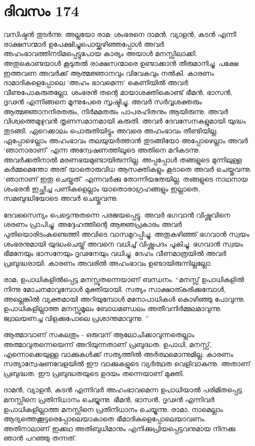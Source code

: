 \section{ദിവസം 174}


വസിഷ്ഠൻ തുടർന്നു: അല്ലയോ രാമ: ശംഭരനെ ദാമൻ, വ്യാളൻ, കടൻ എന്നീ രാക്ഷസന്മാർ ഉപേക്ഷിച്ചുപൊയ്ക്കഴിഞ്ഞപ്പോൾ അവർ അഹംഭാവത്തിനടിമപ്പെട്ടുപോയ കാര്യം അയാൾ മനസ്സിലാക്കി. അതുകൊണ്ടയാൾ കൂടുതൽ രാക്ഷസന്മാരെ ഉണ്ടാക്കാൻ തീരുമാനിച്ചു. പക്ഷേ ഇത്തവണ അവർക്ക് ആത്മജ്ഞാനവും വിവേകവും നൽകി. കാരണം ദാമാദികളെപ്പോലെ ‘അഹം ഭാവമെന്ന’ കെണിയിൽ അവർ വീണുപോകരുതല്ലോ. ശംഭരൻ തന്റെ മായാശക്തികൊണ്ട് ഭീമൻ, ഭാസൻ, ദൃഢൻ എന്നിങ്ങനെ മൂന്നുപേരെ സൃഷ്ടിച്ചു. അവർ സർവ്വശക്തരും ആത്മജ്ഞാനനിരതരും, നിർമമതരും പാപരഹിതനും ആയിരുന്നു. അവർ വിശ്വത്തെമുഴുവൻ തൃണസമാനമായി കരുതി. അവർ ദേവസേനകളുമായി യുദ്ധം തുടങ്ങി. ഏറെക്കാലം പൊരുതിയിട്ടും അവരെ അഹംഭാവം തീണ്ടിയില്ല. ഏപ്പോഴെല്ലാം അഹംഭാവം തലയുയർത്താൻ തുടങ്ങിയോ അപ്പോഴെല്ലാം അവർ ‘ഞാനാരാണ്‌’ എന്ന അന്വേഷണത്തിലൂടെ അതിനെ മറികടന്നു. അവർക്കതിനാൽ മരണഭയമുണ്ടായിരുന്നില്ല. അപ്പപ്പോള്‍ തങ്ങളുടെ മുന്നിലുള്ള കർമ്മമെന്തോ അത് യാതൊരുവിധ ആസക്തികളും കൂടാതെ അവർ ചെയ്തുവന്നു. ‘ഞാനാണ്‌ ഇതു ചെയ്തത്’ എന്നവർക്കു തോന്നിയതേയില്ല. തങ്ങളുടെ നാഥനായ ശംഭരൻ ഇച്ഛിച്ച പണികളെല്ലാം യാതൊരാഗ്രഹങ്ങളും ഇല്ലാതെ, സമബുദ്ധിയോടെ അവർ ചെയ്തുവന്നു.

ദേവസൈന്യം പെട്ടെന്നുതന്നെ പരജയപ്പെട്ടു. അവർ ഭഗവാൻ വിഷ്ണുവിനെ ശരണം പ്രാപിച്ചു. അദ്ദേഹത്തിന്റെ ആജ്ഞപ്രകാരം അവർ പുതിയൊരിടംകണ്ടെത്തി അവിടെ വാസമുറപ്പിച്ചു. അതുകഴിഞ്ഞ് ഭഗവാൻ സ്വയം ശംഭരനുമായി യുദ്ധംചെയ്ത് അവനെ വധിച്ച് വിഷ്ണുപദം പൂകിച്ചു. ഭഗവാൻ സ്വയം ഭീമനേയും ഭാസനേയും ദൃഢനേയും വധിച്ചു. ദേഹം വീണമാത്രയിൽ അവർ പ്രബുദ്ധരായി. കാരണം അവരിൽ അഹംഭാവം ഉണ്ടായിരുന്നില്ലല്ലോ.

രാമ, ഉപാധികളിൽപ്പെട്ട മനസ്സുതന്നെയാണ്‌ ബന്ധനം. “മനസ്സ് ഉപാധികളിൽ നിന്നു മോചനമാവുമ്പോൾ മുക്തിയായി. സത്യം സാക്ഷാത്കരിക്കുമ്പോൾ, അല്ലെങ്കിൽ വ്യക്തമായി അറിയുമ്പോൾ മനോപാധികൾ കൊഴിഞ്ഞു പോവുന്നു. ഉപാധികളില്ലാത്ത മനസ്സുമൂലം ബോധമണ്ഡലം അതീവനിർമ്മലമാവുന്നു. ജ്വാലയണച്ച വിളക്കുപോലെ പ്രശാന്തമാവുന്നു. ”

ആത്മാവാണ്‌ സകലതും - ഒരുവന്‌ ആലോചിക്കാവുന്നതെല്ലാം അത്മാവുതന്നെയെന്ന് അറിയുന്നതാണ്‌ പ്രബുദ്ധത. ഉപാധി, മനസ്സ്, എന്നൊക്കെയുള്ള വാക്കുകൾക്ക് സത്യത്തിൽ അർത്ഥമൊന്നുമില്ല. കാരണം സത്യാന്വേഷണവേളയിൽ ഈ വാക്കുകളുടെ വ്യർത്ഥത വെളിവാകുന്നു. അതാണ്‌ പ്രബുദ്ധത. ഈ പ്രബുദ്ധതയുടെ ഉദയം തന്നെയാണ്‌ മുക്തി.

ദാമൻ, വ്യാളൻ, കടൻ എന്നിവർ അഹംഭാവമെന്ന ഉപാധിയാൽ പരിമിതപ്പെട്ട മനസ്സിനെ പ്രതിനിധാനം ചെയ്യുന്നു. ഭീമൻ, ഭാസൻ, ദൃഢൻ എന്നിവർ ഉപാധികളില്ലാത്ത മനസ്സിനെ പ്രതിനിധാനം ചെയ്യുന്നു. രാമാ, നാമെല്ലാം ആദ്യത്തെക്കൂട്ടരെപ്പോലെയാകാതെ ഭീമാദികളെപ്പോലെയാവണം. അതിനാലാണ്‌ ഇക്കഥ അതിബുധിമാനും എനിക്കുപ്രിയപ്പെട്ടവനുമായ നിനക്കു ഞാൻ പറഞ്ഞു തന്നത്. 

